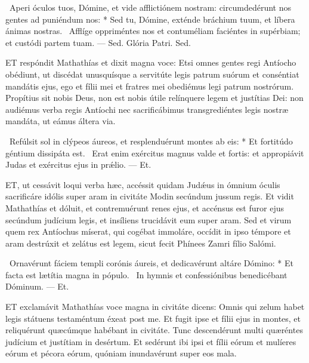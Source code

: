 \R\ Aperi óculos tuos, Dómine, et vide afflictiónem nostram: circumdedérunt nos gentes ad puniéndum nos: * Sed tu, Dómine, exténde bráchium tuum, et líbera ánimas nostras. \V\ Afflíge oppriméntes nos et contuméliam faciéntes in supérbiam; et custódi partem tuam. — Sed. Glória Patri. Sed.




\lettrine[lines=2]{E}{T} respóndit Mathathías et dixit magna voce: Etsi omnes gentes regi Antíocho obédiunt, ut discédat unusquísque a servitúte legis patrum suórum et conséntiat mandátis ejus, ego et fílii mei et fratres mei obediémus legi patrum nostrórum. Propítius sit nobis Deus, non est nobis útile relínquere legem et justítias Dei: non audiémus verba regis Antíochi nec sacrificábimus transgrediéntes legis nostræ mandáta, ut eámus áltera via.

\R\ Refúlsit sol in clýpeos áureos, et resplenduérunt montes ab eis: * Et fortitúdo géntium dissipáta est. \V\ Erat enim exércitus magnus valde et fortis: et appropiávit Judas et exércitus ejus in prǽlio. — Et.


\lettrine[lines=2]{E}{T}, ut cessávit loqui verba hæc, accéssit quidam Judǽus in ómnium óculis sacrificáre idólis super aram in civitáte Modin secúndum jussum regis. Et vidit Mathathías et dóluit, et contremuérunt renes ejus, et accénsus est furor ejus secúndum judícium legis, et insíliens trucidávit eum super aram. Sed et virum quem rex Antíochus míserat, qui cogébat immoláre, occídit in ipso témpore et aram destrúxit et zelátus est legem, sicut fecit Phínees Zamri fílio Salómi.

\R\ Ornavérunt fáciem templi corónis áureis, et dedicavérunt altáre Dómino: * Et facta est lætítia magna in pópulo. \V\ In hymnis et confessiónibus benedicébant Dóminum. — Et.



\lettrine[lines=2]{E}{T} exclamávit Mathathías voce magna in civitáte dicens: Omnis qui zelum habet legis státuens testaméntum éxeat post me. Et fugit ipse et fílii ejus in montes, et reliquérunt quæcúmque habébant in civitáte. Tunc descendérunt multi quæréntes judícium et justítiam in desértum. Et sedérunt ibi ipsi et fílii eórum et mulíeres eórum et pécora eórum, quóniam inundavérunt super eos mala.

